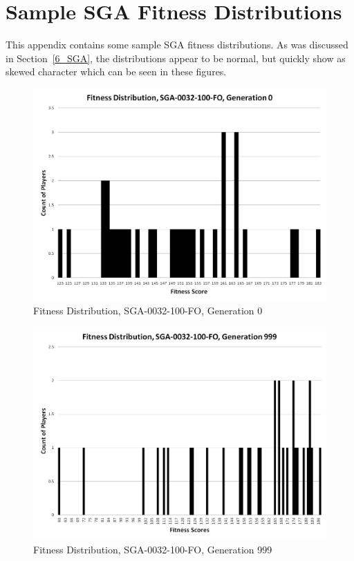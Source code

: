 \clearpage
\chapter{Sample SGA Fitness Distributions}
\label{appendix:SGAFitness}

This appendix contains some sample SGA fitness distributions. As was discussed
in Section~\ref{6_SGA}, the distributions appear to be normal, but quickly show
as skewed character which can be seen in these figures.

\clearpage
\begin{figure}[htp]
\centerline{\includegraphics[width=0.75\columnwidth]{Figures/SGA_0032_100_FO_gen000.png}}
\caption{Fitness Distribution, SGA-0032-100-FO, Generation 0}
\end{figure}

\begin{figure}[htp]
\centerline{\includegraphics[width=0.75\columnwidth]{Figures/SGA_0032_100_FO_gen999.png}}
\caption{Fitness Distribution, SGA-0032-100-FO, Generation 999}
\end{figure}


